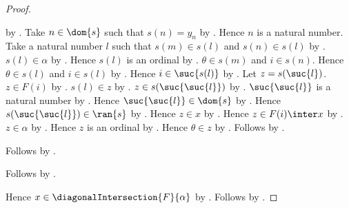 \begin{proof}
\begin{subproof}
\begin{subproof}
\begin{subproof}
                    by .
                Take $n\in\dom{s}$ such that $s(n)=y_n$
                    by .
                Hence $n$ is a natural number.
                Take a natural number $l$ such that
                    $s(m)\in s(l)$ and $s(n)\in s(l)$
                    by .
                $s(l)\in\alpha$ by .
                Hence $s(l)$ is an ordinal
                    by .
                $\theta\in s(m)$ and $i\in s(n)$.
                Hence $\theta\in s(l)$ and $i\in s(l)$
                    by .
                Hence $i\in\suc{s(l)}$ by .
                Let $z=s(\suc{l})$.
                $z\in F(i)$
                    by .
                $s(l)\in z$
                    by .
                $z\in s(\suc{\suc{l}})$
                    by .
                $\suc{\suc{l}}$ is a natural number
                    by .
                Hence $\suc{\suc{l}}\in\dom{s}$ by .
                Hence $s(\suc{\suc{l}})\in\ran{s}$
                    by .
                Hence $z\in x$ by .
                Hence $z\in F(i)\inter x$ by .
                $z\in\alpha$ by .
                Hence $z$ is an ordinal
                    by .
                Hence $\theta\in z$ by .
                Follows by \auto.
            \end{subproof}
            Follows by .
        \end{subproof}
        Follows by .
    \end{subproof}
    Hence $x\in\diagonalIntersection{F}{\alpha}$
        by .
    Follows by \auto.
\end{proof}

